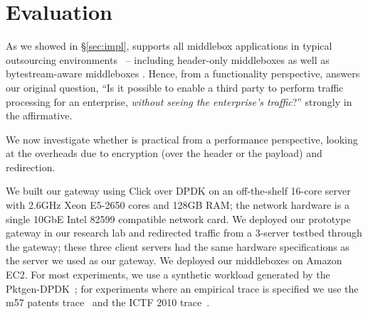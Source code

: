 \section{Evaluation} \label{sec:eval}

As we showed in \S\ref{sec:impl}, \sys supports all middlebox applications in typical outsourcing environments~\cite{aplomb,nfv} -- including header-only middleboxes as well as bytestream-aware middleboxes . 
Hence, from a functionality perspective, \sys answers our original question, ``Is it possible to enable a third party to perform traffic processing for an enterprise, {\em without seeing the enterprise's traffic}?''  strongly in the affirmative.

We now investigate whether \sys is practical from a performance perspective, looking at the overheads due to encryption (over the header or the payload) and redirection. 

We built our gateway using Click over DPDK on an off-the-shelf 16-core server with 2.6GHz Xeon E5-2650 cores and 128GB RAM; the network hardware is a single 10GbE Intel 82599 compatible network card. 
We deployed our prototype gateway in our research lab and redirected traffic from a 3-server testbed through the gateway; these three client servers had the same hardware specifications as the server we used as our gateway.
We deployed our middleboxes on Amazon EC2.
For most experiments, we use a synthetic workload generated by the Pktgen-DPDK~\cite{pktgen}; for experiments where an empirical trace is specified we use the m57 patents trace~\cite{m57} and the ICTF 2010 trace~\cite{ictf}.


